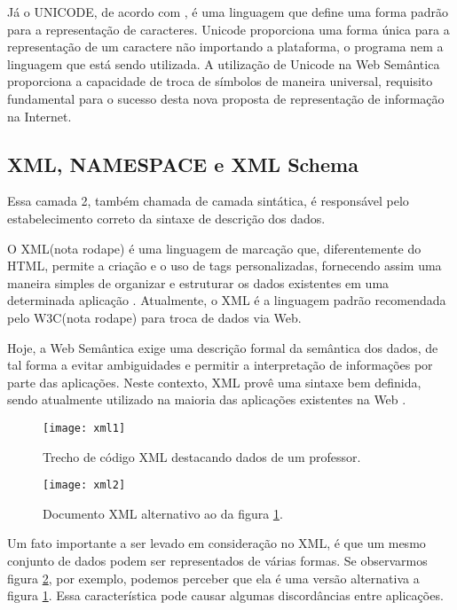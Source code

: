 Já o UNICODE, de acordo com \cite{rosa}, é uma linguagem que define uma forma padrão para a representação de caracteres. Unicode proporciona uma forma única para a representação de um caractere não importando a plataforma, o programa nem a linguagem que está sendo utilizada. A utilização de Unicode na Web Semântica proporciona a capacidade de troca de símbolos de maneira universal, requisito fundamental para o sucesso desta nova proposta de representação de informação na Internet. 

\subsection{XML, NAMESPACE e XML Schema}

Essa camada 2, também chamada de camada sintática, é responsável pelo estabelecimento correto da sintaxe de descrição dos dados.

O XML(nota rodape) é uma linguagem de marcação que, diferentemente do HTML, permite a criação e o uso de tags personalizadas, fornecendo assim uma maneira simples de organizar e estruturar os dados existentes em uma determinada aplicação \cite{XML2009}. Atualmente, o XML é a linguagem padrão recomendada pelo W3C(nota rodape) para troca de dados via Web.

Hoje, a Web Semântica exige uma descrição formal da semântica dos dados, de tal forma a evitar ambiguidades e permitir a interpretação de informações por parte das aplicações. Neste contexto, XML provê uma sintaxe bem definida, sendo atualmente utilizado na maioria das aplicações existentes na Web \cite{filholoscio}.

\graphicspath{{figuras/}}
\begin{figure}[H]
\centering
\texttt{[image: xml1]}
\caption{Trecho de código XML destacando dados de um professor.}
\label{xml1}
\end{figure}

\graphicspath{{figuras/}}
\begin{figure}[H]
\centering
\texttt{[image: xml2]}
\caption{Documento XML alternativo ao da figura \ref{xml1}.}
\label{xml2}
\end{figure}

Um fato importante a ser levado em consideração no XML, é que um mesmo conjunto de dados podem ser representados de várias formas. Se observarmos figura \ref{xml2}, por exemplo, podemos perceber que ela é uma versão alternativa a figura \ref{xml1}. Essa característica pode causar algumas discordâncias entre aplicações. 

